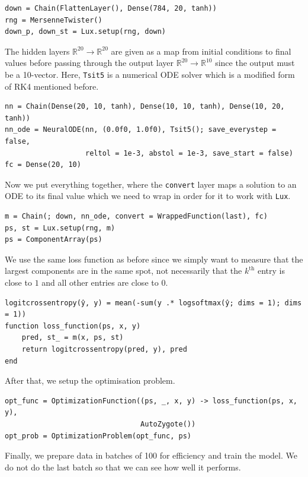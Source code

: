 \documentclass[a4paper,11pt,titlepage]{article}
\theoremstyle{definition}
\theoremstyle{plain}
\theoremstyle{remark}
\begin{document}
\begin{verbatim}
down = Chain(FlattenLayer(), Dense(784, 20, tanh))
rng = MersenneTwister()
down_p, down_st = Lux.setup(rng, down)
\end{verbatim}

The hidden layers $\mathbb{R}^{20}\rightarrow\mathbb{R}^{20}$ are given as a map from initial conditions to final values before passing through the output layer $\mathbb{R}^{20}\rightarrow\mathbb{R}^{10}$ since the output must be a 10-vector. Here, \verb|Tsit5| is a numerical ODE solver which is a modified form of RK4 mentioned before.

\begin{verbatim}
nn = Chain(Dense(20, 10, tanh), Dense(10, 10, tanh), Dense(10, 20, tanh))
nn_ode = NeuralODE(nn, (0.0f0, 1.0f0), Tsit5(); save_everystep = false,
                   reltol = 1e-3, abstol = 1e-3, save_start = false)
fc = Dense(20, 10)
\end{verbatim}

Now we put everything together, where the \verb|convert| layer maps a solution to an ODE to its final value which we need to wrap in order for it to work with \verb|Lux|.

\begin{verbatim}
m = Chain(; down, nn_ode, convert = WrappedFunction(last), fc)
ps, st = Lux.setup(rng, m)
ps = ComponentArray(ps)
\end{verbatim}

We use the same loss function as before since we simply want to measure that the largest components are in the same spot, not necessarily that the $k^{\mathrm{th}}$ entry is close to $1$ and all other entries are close to $0$.

\begin{verbatim}
logitcrossentropy(ŷ, y) = mean(-sum(y .* logsoftmax(ŷ; dims = 1); dims = 1))
function loss_function(ps, x, y)
    pred, st_ = m(x, ps, st)
    return logitcrossentropy(pred, y), pred
end
\end{verbatim}

After that, we setup the optimisation problem.

\begin{verbatim}
opt_func = OptimizationFunction((ps, _, x, y) -> loss_function(ps, x, y),
                                AutoZygote())
opt_prob = OptimizationProblem(opt_func, ps)
\end{verbatim}

Finally, we prepare data in batches of 100 for efficiency and train the model. We do not do the last batch so that we can see how well it performs.
\end{document}

